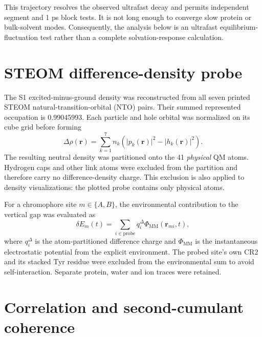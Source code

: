 \documentclass[11pt]{article}
\begin{document}
This trajectory resolves the observed ultrafast decay and permits independent
segment and 1 ps block tests.  It is not long enough to converge slow protein or
bulk-solvent modes.  Consequently, the analysis below is an ultrafast
equilibrium-fluctuation test rather than a complete solvation-response
calculation.

\section{STEOM difference-density probe}

The S1 excited-minus-ground density was reconstructed from all seven printed
STEOM natural-transition-orbital (NTO) pairs.  Their summed represented
occupation is 0.99045993.  Each particle and hole orbital was normalized on its
cube grid before forming
\begin{equation}
  \Delta\rho(\mathbf r)
  = \sum_{k=1}^{7} n_k
    \left(\lvert p_k(\mathbf r)\rvert^2
          -\lvert h_k(\mathbf r)\rvert^2\right).
  \label{eq:difference-density}
\end{equation}
The resulting neutral density was partitioned onto the 41 \emph{physical} QM
atoms.  Hydrogen caps and other link atoms were excluded from the partition and
therefore carry no difference-density charge.  This exclusion is also applied
to density visualizations: the plotted probe contains only physical atoms.

For a chromophore site $m\in\{A,B\}$, the environmental contribution to the
vertical gap was evaluated as
\begin{equation}
  \delta E_m(t) = \sum_{i\in\mathrm{probe}} q_i^{\Delta}
                         \Phi_{\mathrm{MM}}(\mathbf r_{mi},t),
  \label{eq:gap}
\end{equation}
where $q_i^{\Delta}$ is the atom-partitioned difference charge and
$\Phi_{\mathrm{MM}}$ is the instantaneous electrostatic potential from the
explicit environment.  The probed site's own CR2 and its stacked Tyr residue
were excluded from the environmental sum to avoid self-interaction.  Separate
protein, water and ion traces were retained.

\section{Correlation and second-cumulant coherence}
\end{document}
